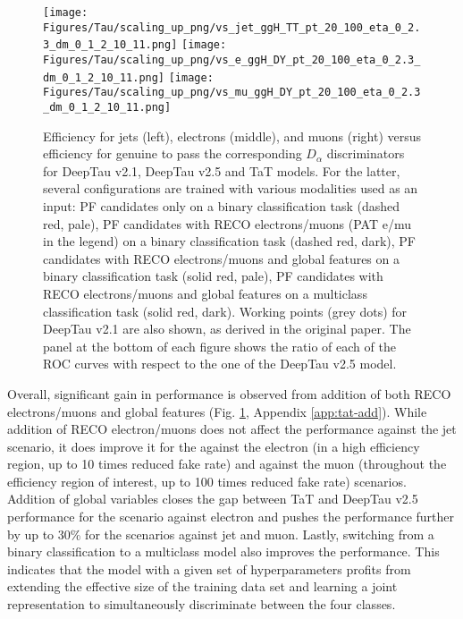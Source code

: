 \begin{figure}[!t]
    \centering
    \texttt{[image: Figures/Tau/scaling\_up\_png/vs\_jet\_ggH\_TT\_pt\_20\_100\_eta\_0\_2.3\_dm\_0\_1\_2\_10\_11.png]}
    \texttt{[image: Figures/Tau/scaling\_up\_png/vs\_e\_ggH\_DY\_pt\_20\_100\_eta\_0\_2.3\_dm\_0\_1\_2\_10\_11.png]}
    \texttt{[image: Figures/Tau/scaling\_up\_png/vs\_mu\_ggH\_DY\_pt\_20\_100\_eta\_0\_2.3\_dm\_0\_1\_2\_10\_11.png]}
    \caption{Efficiency for jets (left), electrons (middle), and muons (right) versus efficiency for genuine \tauh to pass the corresponding $D_\alpha$ discriminators for DeepTau v2.1, DeepTau v2.5 and TaT models. For the latter, several configurations are trained with various modalities used as an input: PF candidates only on a binary classification task (dashed red, pale), PF candidates with RECO electrons/muons (PAT e/mu in the legend) on a binary classification task (dashed red, dark), PF candidates with RECO electrons/muons and global features on a binary classification task (solid red, pale), PF candidates with RECO electrons/muons and global features on a multiclass classification task (solid red, dark). Working points (grey dots) for DeepTau v2.1 are also shown, as derived in the original paper. The panel at the bottom of each figure shows the ratio of each of the ROC curves with respect to the one of the DeepTau v2.5 model.}
    \label{fig:tat_modalities}
\end{figure}

Overall, significant gain in performance is observed from addition of both RECO electrons/muons and global features (Fig. \ref{fig:tat_modalities}, Appendix \ref{app:tat-add}). While addition of RECO electron/muons does not affect the performance against the jet scenario, it does improve it for the \tauh against the electron (in a high \tauh efficiency region, up to 10 times reduced fake rate) and against the muon (throughout the \tauh efficiency region of interest, up to 100 times reduced fake rate) scenarios. Addition of global variables closes the gap between TaT and DeepTau v2.5 performance for the scenario against electron and pushes the performance further by up to 30\% for the scenarios against jet and muon. Lastly, switching from a binary classification to a multiclass model also improves the performance. This indicates that the model with a given set of hyperparameters profits from extending the effective size of the training data set and learning a joint representation to simultaneously discriminate between the four classes.

